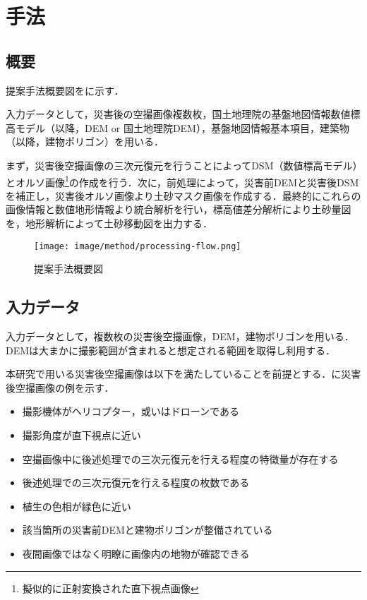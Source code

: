 \chapter{手法}
  \section{概要}
    提案手法概要図をに示す．
    
    入力データとして，災害後の空撮画像複数枚，国土地理院の基盤地図情報数値標高モデル（以降，DEM or 国土地理院DEM），基盤地図情報基本項目，建築物\cite{基盤地図情報}（以降，建物ポリゴン）を用いる．

    まず，災害後空撮画像の三次元復元を行うことによってDSM（数値標高モデル）とオルソ画像\footnote{擬似的に正射変換された直下視点画像}の作成を行う．次に，前処理によって，災害前DEMと災害後DSMを補正し，災害後オルソ画像より土砂マスク画像を作成する．最終的にこれらの画像情報と数値地形情報より統合解析を行い，標高値差分解析により土砂量図を，地形解析によって土砂移動図を出力する．

    \begin{figure}[t]
      \centering
      \texttt{[image: image/method/processing-flow.png]}
      \caption{提案手法概要図}
      \label{提案手法概要図}
    \end{figure}


  \section{入力データ}
    \label{入力データ}
    入力データとして，複数枚の災害後空撮画像，DEM，建物ポリゴンを用いる．DEMは大まかに撮影範囲が含まれると想定される範囲を取得し利用する．

    本研究で用いる災害後空撮画像は以下を満たしていることを前提とする．に災害後空撮画像の例を示す．

    \begin{itemize}
      \setlength{\itemsep}{-5pt}
      \item 撮影機体がヘリコプター，或いはドローンである
      \item 撮影角度が直下視点に近い
      \item 空撮画像中に後述処理での三次元復元を行える程度の特徴量が存在する
      \item 後述処理での三次元復元を行える程度の枚数である
      \item 植生の色相が緑色に近い
      \item 該当箇所の災害前DEMと建物ポリゴンが整備されている
      \item 夜間画像ではなく明瞭に画像内の地物が確認できる
    \end{itemize}

